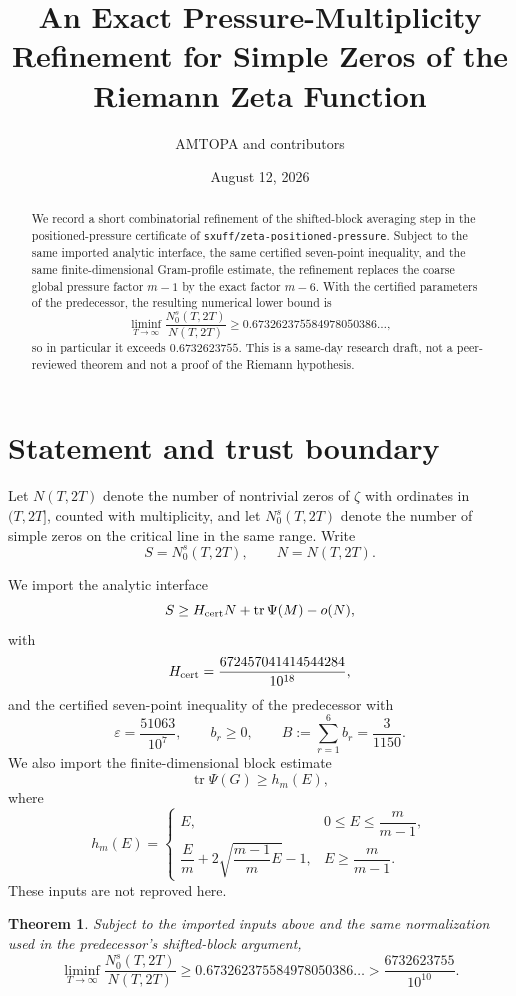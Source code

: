 \documentclass[11pt]{article}
\title{An Exact Pressure-Multiplicity Refinement for Simple Zeros of the Riemann Zeta Function}
\author{AMTOPA and contributors}
\date{August 12, 2026}
\newtheorem{theorem}{Theorem}
\theoremstyle{remark}
\newcommand{\tr}{\operatorname{tr}}
\newcommand{\eps}{\varepsilon}
\newcommand{\liminfT}{\liminf_{T\to\infty}}
\begin{document}
\maketitle

\begin{abstract}
We record a short combinatorial refinement of the shifted-block averaging step in the positioned-pressure certificate of \texttt{sxuff/zeta-positioned-pressure}. Subject to the same imported analytic interface, the same certified seven-point inequality, and the same finite-dimensional Gram-profile estimate, the refinement replaces the coarse global pressure factor $m-1$ by the exact factor $m-6$. With the certified parameters of the predecessor, the resulting numerical lower bound is
\[
\liminfT \frac{N_0^s(T,2T)}{N(T,2T)}
\ge 0.673262375584978050386\ldots,
\]
so in particular it exceeds $0.6732623755$. This is a same-day research draft, not a peer-reviewed theorem and not a proof of the Riemann hypothesis.
\end{abstract}

\section{Statement and trust boundary}

Let $N(T,2T)$ denote the number of nontrivial zeros of $\zeta$ with ordinates in $(T,2T]$, counted with multiplicity, and let $N_0^s(T,2T)$ denote the number of simple zeros on the critical line in the same range. Write
\[
S=N_0^s(T,2T),\qquad N=N(T,2T).
\]

We import the analytic interface
\begin{equation}\label{eq:interface}
S\ge H_{\rm cert}N+\tr\Psi(M)-o(N),
\end{equation}
with
\[
H_{\rm cert}=\frac{672457041414544284}{10^{18}},
\]
and the certified seven-point inequality of the predecessor with
\[
\eps=\frac{51063}{10^7},\qquad b_r\ge 0,\qquad B:=\sum_{r=1}^6 b_r=\frac3{1150}.
\]
We also import the finite-dimensional block estimate
\begin{equation}\label{eq:hm-input}
\tr\Psi(G)\ge h_m(E),
\end{equation}
where
\[
h_m(E)=
\begin{cases}
E, & 0\le E\le \dfrac{m}{m-1},\\[1.2ex]
\dfrac{E}{m}+2\sqrt{\dfrac{m-1}{m}E}-1,
& E\ge \dfrac{m}{m-1}.
\end{cases}
\]
These inputs are not reproved here.

\begin{theorem}\label{thm:main}
Subject to the imported inputs above and the same normalization used in the predecessor's shifted-block argument,
\[
\liminfT \frac{N_0^s(T,2T)}{N(T,2T)}
\ge 0.673262375584978050386\ldots
>\frac{6732623755}{10^{10}}.
\]
\end{theorem}
\end{document}
